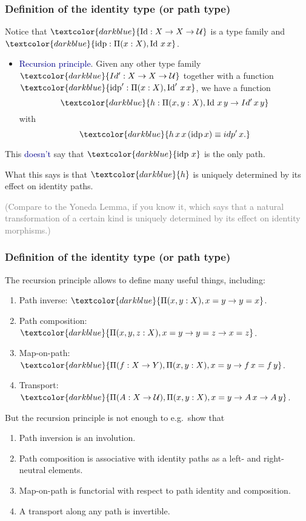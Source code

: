 \documentclass[aspectratio=169]{beamer}
\newcommand{\eqq}{\equiv}
\newcommand{\U}{\operatorname{\mathcal{U}}}
\newcommand{\db}{\textcolor{darkblue}}
\newcommand{\grey}{\textcolor{grey}}
\newcommand{\m}[1]{$\db{#1}$}
\newcommand{\M}[1]{\[\db{#1}\]}
\newcommand{\idp}{\operatorname{idp}}
\newcommand{\Id}{\operatorname{Id}}
\begin{document}
\begin{frame}
  \frametitle{Definition of the identity type (or path type)}

  Notice that \m{\Id : X \to X \to \U} is a type family and \m{\idp : \Pi(x:X), \Id \, x \, x}.

  \begin{itemize}
    \vfill \item \db{Recursion principle}. Given any other type family \m{Id' : X \to X \to \U} together with a function \m{\idp' : \Pi(x:X), \Id' \, x \, x}, we have a function
    \M{h : \Pi(x,y:X), \Id\,x\,y \to Id'\,x \, y  }
    with
    \M{h\,x\,x\,(\idp x) \eqq idp' \, x.}
   \end{itemize}

    This \db{doesn't} say that \m{\idp \, x} is the only path.

\vfill

    What this says is that \m{h} is uniquely determined by its effect on identity paths.

\vfill

    \grey{(Compare to the Yoneda Lemma, if you know it, which says that a
    natural transformation of a certain kind is uniquely determined by
    its effect on identity morphisms.)}

 \end{frame}


\begin{frame}
  \frametitle{Definition of the identity type (or path type)}

  The recursion principle allows to define many useful things, including:
  \begin{enumerate}
  \item Path inverse: \m{\Pi(x,y:X), x = y \to y = x}.
  \item Path composition: \m{\Pi(x,y,z:X), x = y \to y = z \to x = z}.
  \item Map-on-path: \m{\Pi(f:X \to Y),\Pi(x,y:X), x = y \to f \, x = f \, y}.
  \item Transport: \m{\Pi(A : X \to \U), \Pi (x,y:X), x = y \to A \, x \to A \, y}.
\end{enumerate}

But the recursion principle is not enough to e.g.\ show that
\begin{enumerate}
\item Path inversion is an involution.
\item Path composition is associative with identity paths as a left- and right-neutral elements.
\item Map-on-path is functorial with respect to path identity and composition.
\item A transport along any path is invertible.
\end{enumerate}


 \end{frame}
\end{document}
